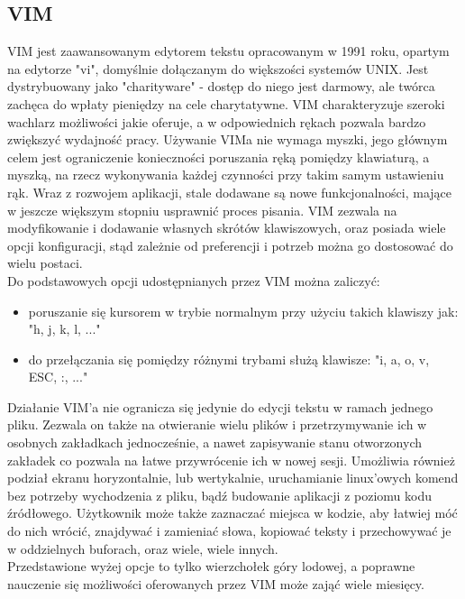 \documentclass[12pt, a4paper]{article}
\begin{document}
\begin{sloppypar}
{  \subsection{VIM}
  {
    VIM jest zaawansowanym edytorem tekstu opracowanym w 1991 roku, opartym na edytorze
    "vi", domyślnie dołączanym do większości systemów UNIX. Jest dystrybuowany jako
    "charityware" - dostęp do niego jest darmowy, ale twórca zachęca do wpłaty pieniędzy
    na cele charytatywne. VIM charakteryzuje szeroki wachlarz możliwości jakie oferuje,
    a w odpowiednich rękach pozwala bardzo zwiększyć wydajność pracy. Używanie VIMa
    nie wymaga myszki, jego głównym celem jest ograniczenie konieczności poruszania ręką
    pomiędzy klawiaturą, a myszką, na rzecz wykonywania każdej czynności przy takim samym
    ustawieniu rąk. Wraz z rozwojem aplikacji, stale dodawane są nowe funkcjonalności,
    mające w jeszcze większym stopniu usprawnić proces pisania. VIM zezwala na
    modyfikowanie i dodawanie własnych skrótów klawiszowych, oraz posiada wiele opcji
    konfiguracji, stąd zależnie od preferencji i potrzeb można go dostosować do wielu
    postaci.\\
    Do podstawowych opcji udostępnianych przez VIM można zaliczyć:
    \begin{itemize}
      \item poruszanie się kursorem w trybie normalnym przy użyciu takich klawiszy jak:\\
      "h, j, k, l, ..."
      \item do przełączania się pomiędzy różnymi trybami służą klawisze:
      "i, a, o, v, ESC, :, ..."
    \end{itemize}
    Działanie VIM'a nie ogranicza się jedynie do edycji tekstu w ramach jednego pliku.
    Zezwala on także na otwieranie wielu plików i przetrzymywanie ich w osobnych zakładkach
    jednocześnie, a nawet zapisywanie stanu otworzonych zakładek co pozwala na łatwe przywrócenie
    ich w nowej sesji. Umożliwia również podział ekranu horyzontalnie, lub wertykalnie,
    uruchamianie linux'owych komend bez potrzeby wychodzenia z pliku, bądź budowanie aplikacji z
    poziomu kodu źródłowego. Użytkownik może także zaznaczać miejsca w kodzie, aby łatwiej móć do
    nich wrócić, znajdywać i zamieniać słowa, kopiować teksty i przechowywać je w oddzielnych
    buforach, oraz wiele, wiele innych. \\   
    Przedstawione wyżej opcje to tylko wierzchołek góry lodowej, a poprawne nauczenie
    się możliwości oferowanych przez VIM może zająć wiele miesięcy.
  }
}
\end{sloppypar}
\end{document}
